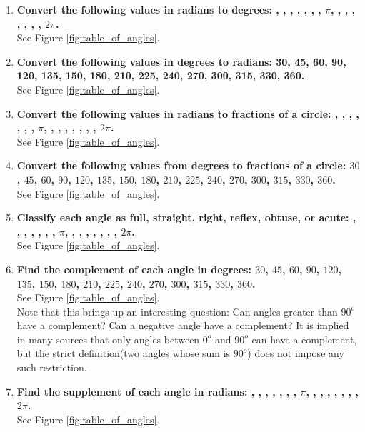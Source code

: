 \begin{enumerate}
\item{{\bf Convert the following values in radians to degrees: \pisix, \pifour, \pithree, \pitwo, \twopithree, \threepifour, \fivepisix, $\pi$, \sevenpisix, \fivepifour, \fourpithree, \threepitwo, \fivepithree, \sevenpifour, \elevenpisix, $2\pi$.\\}{See Figure \ref{fig:table_of_angles}.}}

\item{{\bf Convert the following values in degrees to radians: 30, 45, 60, 90, 120, 135, 150, 180, 210, 225, 240, 270, 300, 315, 330, 360.}\\
{See Figure \ref{fig:table_of_angles}.}}

\item{{\bf Convert the following values in radians to fractions of a circle:  \pisix, \pifour, \pithree, \pitwo, \twopithree, \threepifour, \fivepisix, $\pi$, \sevenpisix, \fivepifour, \fourpithree, \threepitwo, \fivepithree, \sevenpifour, \elevenpisix, $2\pi$.\\}
{See Figure \ref{fig:table_of_angles}.}}

\item{{\bf Convert the following values from degrees to fractions of a circle: $30$, $45$, $60$, $90$, $120$, $135$, $150$, $180$, $210$, $225$, $240$, $270$, $300$, $315$, $330$, $360$.\\}{See Figure \ref{fig:table_of_angles}.}}

\item{{\bf Classify each angle as full, straight, right, reflex, obtuse, or acute:  \pisix, \pifour, \pithree, \pitwo, \twopithree, \threepifour, \fivepisix, $\pi$, \sevenpisix, \fivepifour, \fourpithree, \threepitwo, \fivepithree, \sevenpifour, \elevenpisix, $2\pi$.\\}{See Figure \ref{fig:table_of_angles}.}}

\item{{\bf Find the complement of each angle in degrees: $30$, $45$, $60$, $90$, $120$, $135$, $150$, $180$, $210$, $225$, $240$, $270$, $300$, $315$, $330$, $360$.\\}{See Figure \ref{fig:table_of_angles}.\\}
Note that this brings up an interesting question:  Can angles greater than $90^o$ have a complement?  Can a negative angle have a complement?  It is implied in many sources that only angles between $0^o$ and $90^o$ can have a complement, but the strict definition(two angles whose sum is $90^o$) does not impose any such restriction.}

\item{{\bf Find the supplement of each angle in radians:  \pisix, \pifour, \pithree, \pitwo, \twopithree, \threepifour, \fivepisix, $\pi$, \sevenpisix, \fivepifour, \fourpithree, \threepitwo, \fivepithree, \sevenpifour, \elevenpisix, $2\pi$.\\}{See Figure \ref{fig:table_of_angles}.}}

\end{enumerate}
